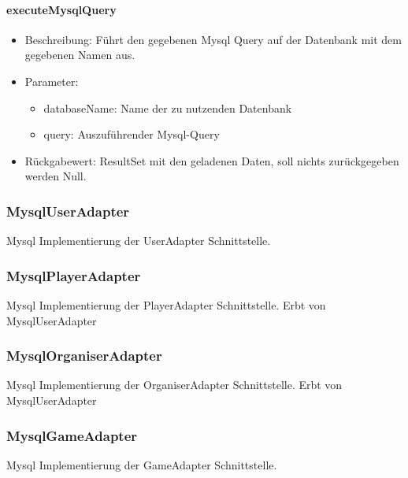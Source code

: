 \documentclass[a4paper]{scrreprt}
\begin{document}
    \paragraph{executeMysqlQuery}
    \begin{itemize}
        \item Beschreibung: Führt den gegebenen Mysql Query auf der Datenbank mit dem gegebenen Namen aus.
        \item Parameter:
        \begin{itemize}
            \item databaseName: Name der zu nutzenden Datenbank
            \item query: Auszuführender Mysql-Query
        \end{itemize}
        \item Rückgabewert: ResultSet mit den geladenen Daten, soll nichts zurückgegeben werden Null.
    \end{itemize}

    \subsubsection{MysqlUserAdapter}
    Mysql Implementierung der UserAdapter Schnittstelle.

    \subsubsection{MysqlPlayerAdapter}
    Mysql Implementierung der PlayerAdapter Schnittstelle.
    Erbt von MysqlUserAdapter

    \subsubsection{MysqlOrganiserAdapter}
    Mysql Implementierung der OrganiserAdapter Schnittstelle.
    Erbt von MysqlUserAdapter

    \subsubsection{MysqlGameAdapter}
    Mysql Implementierung der GameAdapter Schnittstelle.
\end{document}
